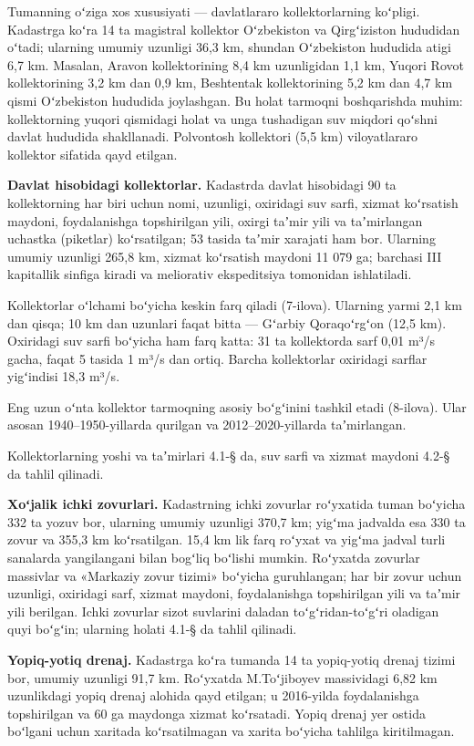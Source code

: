 Tumanning oʻziga xos xususiyati --- davlatlararo kollektorlarning
koʻpligi. Kadastrga koʻra 14 ta magistral kollektor Oʻzbekiston va
Qirgʻiziston hududidan oʻtadi; ularning umumiy uzunligi 36,3 km, shundan
Oʻzbekiston hududida atigi 6,7 km. Masalan, Aravon kollektorining 8,4 km
uzunligidan 1,1 km, Yuqori Rovot kollektorining 3,2 km dan 0,9 km,
Beshtentak kollektorining 5,2 km dan 4,7 km qismi Oʻzbekiston hududida
joylashgan. Bu holat tarmoqni boshqarishda muhim: kollektorning yuqori
qismidagi holat va unga tushadigan suv miqdori qoʻshni davlat hududida
shakllanadi. Polvontosh kollektori (5,5 km) viloyatlararo kollektor
sifatida qayd etilgan.

\textbf{Davlat hisobidagi kollektorlar.} Kadastrda davlat hisobidagi 90
ta kollektorning har biri uchun nomi, uzunligi, oxiridagi suv sarfi,
xizmat koʻrsatish maydoni, foydalanishga topshirilgan yili, oxirgi
taʼmir yili va taʼmirlangan uchastka (piketlar) koʻrsatilgan; 53 tasida
taʼmir xarajati ham bor. Ularning umumiy uzunligi 265,8 km, xizmat
koʻrsatish maydoni 11 079 ga; barchasi III kapitallik sinfiga kiradi va
meliorativ ekspeditsiya tomonidan ishlatiladi.

Kollektorlar oʻlchami boʻyicha keskin farq qiladi (7-ilova). Ularning
yarmi 2,1 km dan qisqa; 10 km dan uzunlari faqat bitta --- Gʻarbiy
Qoraqoʻrgʻon (12,5 km). Oxiridagi suv sarfi boʻyicha ham farq katta: 31
ta kollektorda sarf 0,01 m³/s gacha, faqat 5 tasida 1 m³/s dan ortiq.
Barcha kollektorlar oxiridagi sarflar yigʻindisi 18,3 m³/s.

Eng uzun oʻnta kollektor tarmoqning asosiy boʻgʻinini tashkil etadi
(8-ilova). Ular asosan 1940--1950-yillarda qurilgan va
2012--2020-yillarda taʼmirlangan.

Kollektorlarning yoshi va taʼmirlari 4.1-§ da, suv sarfi va xizmat
maydoni 4.2-§ da tahlil qilinadi.

\textbf{Xoʻjalik ichki zovurlari.} Kadastrning ichki zovurlar roʻyxatida
tuman boʻyicha 332 ta yozuv bor, ularning umumiy uzunligi 370,7 km;
yigʻma jadvalda esa 330 ta zovur va 355,3 km koʻrsatilgan. 15,4 km lik
farq roʻyxat va yigʻma jadval turli sanalarda yangilangani bilan bogʻliq
boʻlishi mumkin. Roʻyxatda zovurlar massivlar va «Markaziy zovur tizimi»
boʻyicha guruhlangan; har bir zovur uchun uzunligi, oxiridagi sarf,
xizmat maydoni, foydalanishga topshirilgan yili va taʼmir yili berilgan.
Ichki zovurlar sizot suvlarini daladan toʻgʻridan-toʻgʻri oladigan quyi
boʻgʻin; ularning holati 4.1-§ da tahlil qilinadi.

\textbf{Yopiq-yotiq drenaj.} Kadastrga koʻra tumanda 14 ta yopiq-yotiq
drenaj tizimi bor, umumiy uzunligi 91,7 km. Roʻyxatda M.Toʻjiboyev
massividagi 6,82 km uzunlikdagi yopiq drenaj alohida qayd etilgan; u
2016-yilda foydalanishga topshirilgan va 60 ga maydonga xizmat
koʻrsatadi. Yopiq drenaj yer ostida boʻlgani uchun xaritada
koʻrsatilmagan va xarita boʻyicha tahlilga kiritilmagan.

